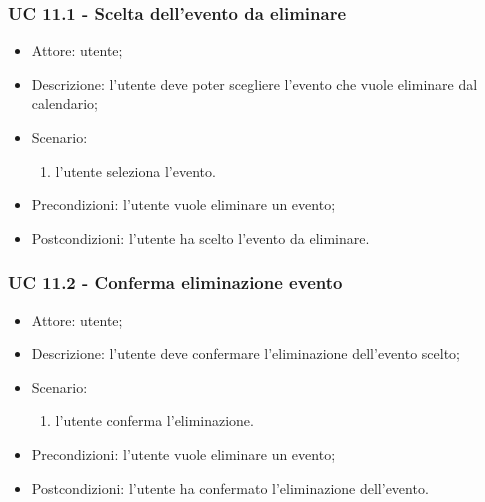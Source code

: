 \subsubsection{UC 11.1 - Scelta dell'evento da eliminare} \label{sec: UC 11.1}
\begin{itemize}
    \item Attore: utente;
    \item Descrizione: l'utente deve poter scegliere l'evento che vuole eliminare dal calendario;
    \item Scenario:
        \begin{enumerate}
        \item l'utente seleziona l'evento.
        \end{enumerate}
    
    \item Precondizioni: l'utente vuole eliminare un evento;
    \item Postcondizioni: l'utente ha scelto l'evento da eliminare.
\end{itemize}


\subsubsection{UC 11.2 - Conferma eliminazione evento} \label{sec: UC 11.2}
\begin{itemize}
    \item Attore: utente;
    \item Descrizione: l'utente deve confermare l'eliminazione dell'evento scelto;
    \item Scenario:
        \begin{enumerate}
        \item l'utente conferma l'eliminazione.
        \end{enumerate}
    
    \item Precondizioni: l'utente vuole eliminare un evento;
    \item Postcondizioni: l'utente ha confermato l'eliminazione dell'evento.
\end{itemize}


